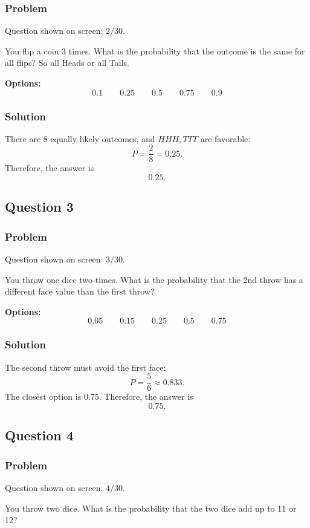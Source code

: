 \documentclass[12pt]{article}
\begin{document}
\subsubsection{Problem}
Question shown on screen: \(2/30\).

You flip a coin 3 times. What is the probability that the outcome is the same for all flips? So all Heads or all Tails.

\noindent\textbf{Options:}
\[
\boxed{0.1}
\qquad
\boxed{0.25}
\qquad
\boxed{0.5}
\qquad
\boxed{0.75}
\qquad
\boxed{0.9}
\]

\subsubsection{Solution}
There are \(8\) equally likely outcomes, and \(HHH,TTT\) are favorable:
\[
P=\frac{2}{8}=0.25.
\]
Therefore, the answer is
\[
\boxed{0.25}.
\]

\subsection{Question 3}
\subsubsection{Problem}
Question shown on screen: \(3/30\).

You throw one dice two times. What is the probability that the 2nd throw has a different face value than the first throw?

\noindent\textbf{Options:}
\[
\boxed{0.05}
\qquad
\boxed{0.15}
\qquad
\boxed{0.25}
\qquad
\boxed{0.5}
\qquad
\boxed{0.75}
\]

\subsubsection{Solution}
The second throw must avoid the first face:
\[
P=\frac{5}{6}\approx 0.833.
\]
The closest option is \(0.75\). Therefore, the answer is
\[
\boxed{0.75}.
\]

\subsection{Question 4}
\subsubsection{Problem}
Question shown on screen: \(4/30\).

You throw two dice. What is the probability that the two dice add up to 11 or 12?
\end{document}
